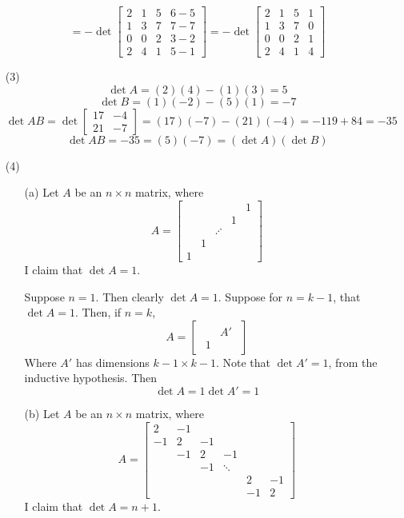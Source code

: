 \documentclass[12pt]{article}
\begin{document}
\begin{itemize}
$$= -\det\begin{bmatrix}
2 & 1 & 5 & 6-5 \\
1 & 3 & 7 & 7-7 \\
0 & 0 & 2 & 3-2 \\
2 & 4 & 1 & 5-1
\end{bmatrix} = -\det\begin{bmatrix}
2 & 1 & 5 & 1 \\
1 & 3 & 7 & 0 \\
0 & 0 & 2 & 1 \\
2 & 4 & 1 & 4
\end{bmatrix}$$
\item[(3)]
$$\det A = (2)(4) - (1)(3) = 5$$
$$\det B = (1)(-2) - (5)(1) = -7$$
$$\det AB = \det\begin{bmatrix}
17 & -4 \\
21 & -7
\end{bmatrix} = (17)(-7) - (21)(-4) = -119 + 84 = -35$$
$$\det AB = -35 = (5)(-7) = (\det A)(\det B)$$
\item[(4)]
\begin{itemize}
\item[(a)]
Let $A$ be an $n \times n$ matrix, where
$$A = \begin{bmatrix}
& & & & 1 \\
& & & 1 & \\
& & \iddots & & \\
& 1 & & & \\
1 & & & &
\end{bmatrix}$$
I claim that $\det A = 1$. 

Suppose $n = 1$. Then clearly $\det A = 1$. Suppose for $n = k - 1$, that $\det A = 1$. Then, if $n = k$,
$$A = \begin{bmatrix}
\begin{array}{c|c}
& A' \\
\hline
1 & 
\end{array}
\end{bmatrix}$$
Where $A'$ has dimensions $k - 1 \times k - 1$. Note that $\det A' = 1$, from the inductive hypothesis. Then
$$\det A = 1\det A' = 1$$
\item[(b)]
Let $A$ be an $n \times n$ matrix, where
$$A = \begin{bmatrix}
2 & -1 \\
-1 & 2 & -1 \\
& -1 & 2 & -1 \\
& & -1 & \ddots \\
& & & & 2 & -1 \\
& & & & -1 & 2
\end{bmatrix}$$
I claim that $\det A = n + 1$.


\end{itemize}
\end{itemize}
\end{document}
